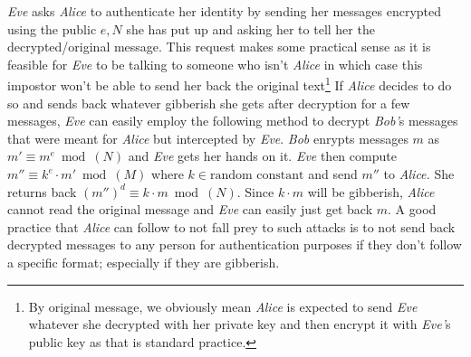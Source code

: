 			\begin{tcolorbox}[title=RSA Oracle Method, breakable, colback=yellow!5!white,colframe=yellow!75!black]
 			\emph{Eve} asks \emph{Alice} to authenticate her identity by sending her messages encrypted using the public \(e, N\) she has put up and asking her to tell her the decrypted/original message. This request makes some practical sense as it is feasible for \emph{Eve} to be talking to someone who isn't \emph{Alice} in which case this impostor won't be able to send her back the original text\footnote{By original message, we obviously mean \emph{Alice} is expected to send \emph{Eve} whatever she decrypted with her private key and then encrypt it with \emph{Eve'}s public key as that is standard practice.}\vspace{0.5cm}
 			If \emph{Alice} decides to do so and sends back whatever gibberish she gets after decryption for a few messages, \emph{Eve} can easily employ the following method to decrypt \emph{Bob'}s messages that were meant for \emph{Alice} but intercepted by \emph{Eve}.\vspace{0.5cm}
 			\emph{Bob} enrypts messages \(m\) as \(m'\equiv m^e \bmod(N)\) and \emph{Eve} gets her hands on it. \emph{Eve} then compute \(m''\equiv k^e \cdot m' \bmod(M)\) where \(k\in \text{random constant}\) and send $m''$ to \emph{Alice.} \vspace{0.5cm}
 			She returns back \((m'')^{d}\equiv k\cdot m \bmod(N)\). Since \(k\cdot m\) will be gibberish, \emph{Alice} cannot read the original message and \emph{Eve} can easily just get back \(m\).
 			\tcblower
 			A good practice that \emph{Alice} can follow to not fall prey to such attacks is to not send back decrypted messages to any person for authentication purposes if they don't follow a specific format; especially if they are gibberish. 
		\end{tcolorbox}

